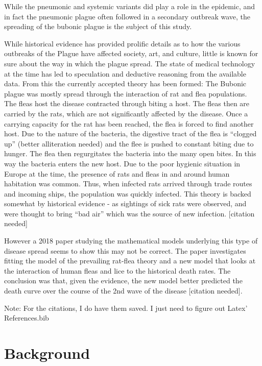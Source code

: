 \documentclass [letterpaper, 12pt] {article}
\begin{document}
While the pneumonic and systemic variants did play a role in the epidemic, and in fact the pneumonic plague often followed in a secondary outbreak wave, the spreading of the bubonic plague is the subject of this study.

While historical evidence has provided prolific details as to how the various outbreaks of the Plague have affected society, art, and culture, little is known for sure about the way in which the plague spread. The state of medical technology at the time has led to speculation and deductive reasoning from the available data. From this the currently accepted theory has been formed: The Bubonic plague was mostly spread through the interaction of rat and flea populations. The fleas host the disease contracted through biting a host. The fleas then are carried by the rats, which are not significantly affected by the disease. Once a carrying capacity for the rat has been reached, the flea is forced to find another host. Due to the nature of the bacteria, the digestive tract of the flea is “clogged up” (better alliteration needed) and the flee is pushed to constant biting due to hunger. The flea then regurgitates the bacteria into the many open bites. In this way the bacteria enters the new host. 
Due to the poor hygienic situation in Europe at the time, the presence of rats and fleas in and around human habitation was common. Thus, when infected rats arrived through trade routes and incoming ships, the population was quickly infected. 
This theory is backed somewhat by historical evidence - as sightings of sick rats were observed, and were thought to bring “bad air” which was the source of new infection. [citation needed]

However a 2018 paper studying the mathematical models underlying this type of disease spread seems to show this may not be correct. The paper investigates fitting the model of the prevailing rat-flea theory and a new model that looks at the interaction of human fleas and lice to the historical death rates. The conclusion was that, given the evidence, the new model better predicted the death curve over the course of the 2nd wave of the disease [citation needed].

Note: For the citations, I do have them saved. I just need to figure out Latex' References.bib
\pagebreak

\section {Background}
\end{document}
